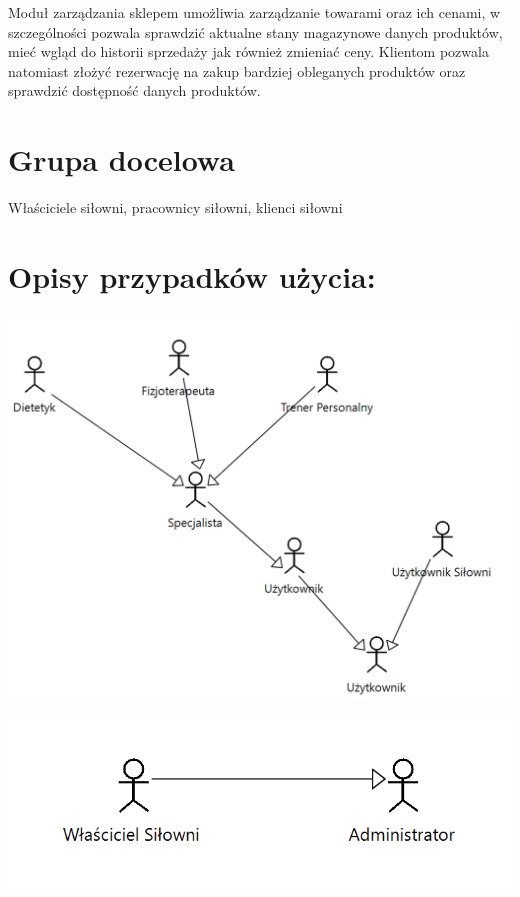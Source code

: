 \documentclass[
]{article}
\begin{document}
{}

{Moduł zarządzania sklepem umożliwia zarządzanie towarami oraz ich
cenami, w szczególności pozwala sprawdzić aktualne stany magazynowe
danych produktów, mieć wgląd do historii sprzedaży jak również zmieniać
ceny. Klientom pozwala natomiast złożyć rezerwację na zakup bardziej
obleganych produktów oraz sprawdzić dostępność danych produktów.}

{}

\hypertarget{h.no1j4fdk62eq}{%
\section{\texorpdfstring{{Grupa
docelowa}}{Grupa docelowa}}\label{h.no1j4fdk62eq}}

{Właściciele siłowni, pracownicy siłowni, klienci siłowni}

{}

\hypertarget{h.oj1ynmpx01z3}{%
\section{\texorpdfstring{{O}{pisy przypadków
użycia:}}{Opisy przypadków użycia:}}\label{h.oj1ynmpx01z3}}

{\includegraphics{diagrams/use_cases/actors_hierarchy.png}}

{\includegraphics{diagrams/use_cases/wlasciciel_silowni_hierarchy.png}}
\end{document}

